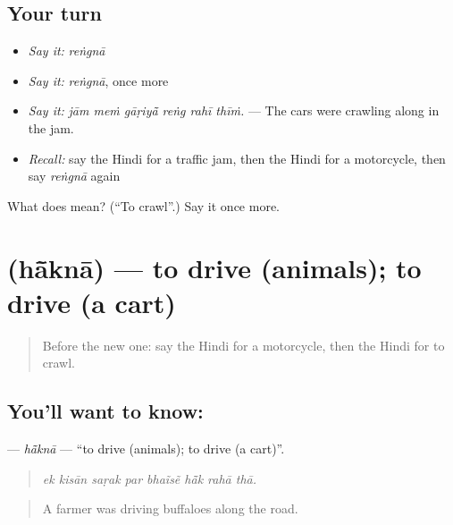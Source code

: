 \subsection*{Your turn}
\begin{itemize}
\raggedright
  \item \emph{Say it:} \emph{reṅgnā}
  \item \emph{Say it:} \emph{reṅgnā}, once more
  \item \emph{Say it:} \emph{jām meṁ gāṛiyā̃ reṅg rahī thīṁ.} — The cars were crawling along in the jam.
  \item \emph{Recall:} say the Hindi for a traffic jam, then the Hindi for a motorcycle, then say \emph{reṅgnā} again
\end{itemize}

\begin{tcolorbox}[breakable,colback=teal!4,colframe=teal!35!black,title={Before you move on}]
What does  mean? (\textquotedblleft{}To crawl\textquotedblright{}.) Say it once more.
\end{tcolorbox}
\section[\texorpdfstring{\hi{हाँकना} (hā̃knā)}{हाँकना (hā̃knā)}]{ (hā̃knā) — to drive (animals); to drive (a cart)}

\label{lesson:HI-C404-hakna}



\begin{quote}
Before the new one: say the Hindi for a motorcycle, then the Hindi for to crawl.
\end{quote}

\subsection*{You'll want to know: }
\textbf{} — \emph{hā̃knā} — \textquotedblleft{}to drive (animals); to drive (a cart)\textquotedblright{}.

\begin{quote}
       
\end{quote}

\begin{quote}
\emph{ek kisān saṛak par bhaĩsẽ hā̃k rahā thā.}
\end{quote}

\begin{quote}
A farmer was driving buffaloes along the road.
\end{quote}

